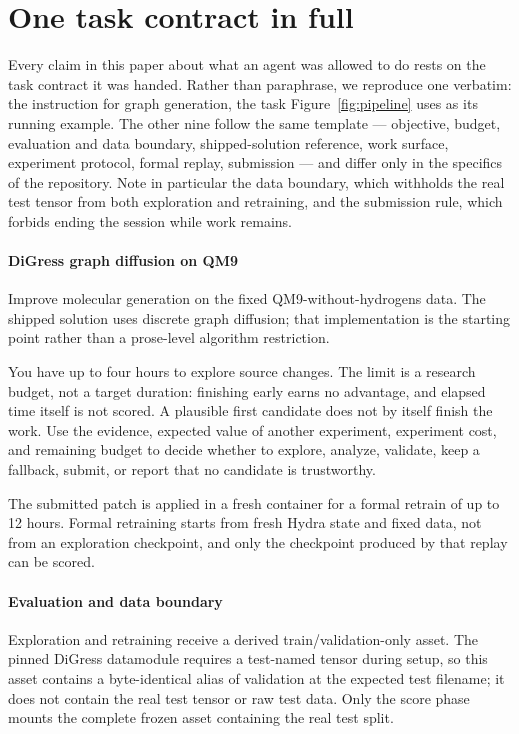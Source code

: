 \section{One task contract in full}
\label{app:instruction}

Every claim in this paper about what an agent was allowed to do rests on the task contract it was
handed. Rather than paraphrase, we reproduce one verbatim: the instruction for graph generation, the
task Figure~\ref{fig:pipeline} uses as its running example. The other nine follow the same template ---
objective, budget, evaluation and data boundary, shipped-solution reference, work surface, experiment
protocol, formal replay, submission --- and differ only in the specifics of the repository. Note in
particular the data boundary, which withholds the real test tensor from both exploration and
retraining, and the submission rule, which forbids ending the session while work remains.

\begingroup\small
\paragraph{DiGress graph diffusion on QM9}

Improve molecular generation on the fixed QM9-without-hydrogens data. The shipped solution uses discrete graph diffusion; that implementation is the starting point rather than a prose-level algorithm restriction.

You have up to four hours to explore source changes. The limit is a research budget, not a target duration: finishing early earns no advantage, and elapsed time itself is not scored. A plausible first candidate does not by itself finish the work. Use the evidence, expected value of another experiment, experiment cost, and remaining budget to decide whether to explore, analyze, validate, keep a fallback, submit, or report that no candidate is trustworthy.

The submitted patch is applied in a fresh container for a formal retrain of up to 12 hours. Formal retraining starts from fresh Hydra state and fixed data, not from an exploration checkpoint, and only the checkpoint produced by that replay can be scored.

\paragraph{Evaluation and data boundary}

Exploration and retraining receive a derived train/validation-only asset. The pinned DiGress datamodule requires a test-named tensor during setup, so this asset contains a byte-identical alias of validation at the expected test filename; it does not contain the real test tensor or raw test data. Only the score phase mounts the complete frozen asset containing the real test split.

